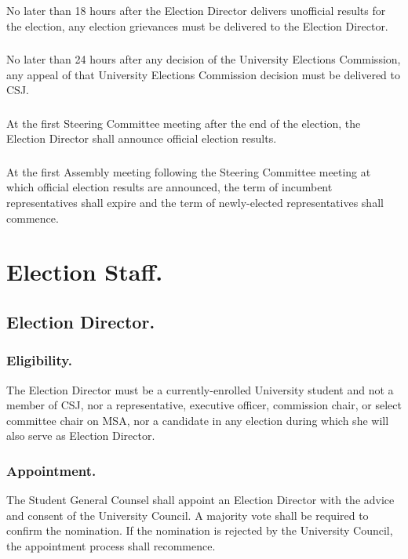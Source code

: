 \subsubsection{}
No later than 18 hours after the Election Director delivers unofficial results for the election, any election grievances must be delivered to the Election Director.
\subsubsection{}
No later than 24 hours after any decision of the University Elections Commission, any appeal of that University Elections Commission decision must be delivered to CSJ.
\subsubsection{}
At the first Steering Committee meeting after the end of the election, the Election Director shall announce official election results.
\subsubsection{}
At the first Assembly meeting following the Steering Committee meeting at which official election results are announced, the term of incumbent representatives shall expire and the term of newly-elected representatives shall commence. 


\section{Election Staff.}

\subsection{Election Director.}

\subsubsection{Eligibility.}
The Election Director must be a currently-enrolled University student and not a member of CSJ, nor a representative, executive officer, commission chair, or select committee chair on MSA, nor a candidate in any election during which she will also serve as Election Director.
\subsubsection{Appointment.}
The Student General Counsel shall appoint an Election Director with the advice and consent of the University Council.  A majority vote shall be required to confirm the nomination.  If the nomination is rejected by the University Council, the appointment process shall recommence.  
